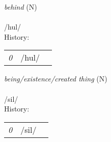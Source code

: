 \vspace{15pt}
\begin{nopagebreak}
 \textit{behind} (N)\\
\\
\noindent /h{\textprimstress}ul/\\


\noindent History:

\vspace{-0pt}
\hspace{40pt}
\begin{tabular}{ccc}
\textit{0} & /hul/& \\
\end{tabular}

\vspace{20pt}\hline

\end{nopagebreak}
\filbreak



\vspace{15pt}
\begin{nopagebreak}
 \textit{being/existence/created thing} (N)\\
\\
\noindent /s{\textprimstress}il/\\


\noindent History:

\vspace{-0pt}
\hspace{40pt}
\begin{tabular}{ccc}
\textit{0} & /sil/& \\
\end{tabular}

\vspace{20pt}\hline

\end{nopagebreak}
\filbreak



